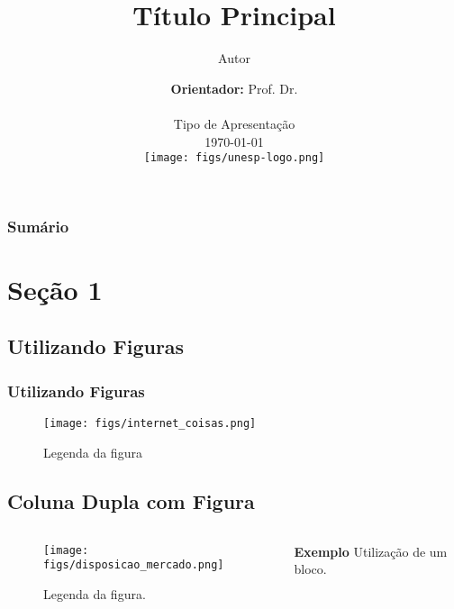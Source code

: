 \documentclass{beamer}
\begin{document}
\title[Título pequeno para os slides]
{Título Principal}  
\author{Autor}
\date{\textbf{Orientador:} Prof. Dr. \\~\\ Tipo de Apresentação \\ \today \\ \hspace*{9.8cm} \texttt{[image: figs/unesp-logo.png]}} 

\begin{frame}
\titlepage
\end{frame}

\begin{frame}\frametitle{Sumário}\footnotesize \tableofcontents
\end{frame} 

\section{Seção 1} 
\subsection{Utilizando Figuras}
\begin{frame}\frametitle{Utilizando Figuras} 
\begin{figure}[h]
\centering
\texttt{[image: figs/internet\_coisas.png]}
\caption{Legenda da figura}
\label{f.internet_coisas}
\end{figure}
\end{frame}

\subsection{Coluna Dupla com Figura}
\begin{frame}
\begin{columns}
\begin{column}{6cm}
\begin{figure}[h]
\caption{\small Legenda da figura.}
\centering
\texttt{[image: figs/disposicao\_mercado.png]}
\label{f.disposicao_mercado}
\end{figure}
\end{column}
\begin{column}{5cm}
\begin{block}{\center \textbf{Exemplo}}
\justify Utilização de um bloco.
\end{block}
\end{column}
\end{columns}
\end{frame}
\end{document}
